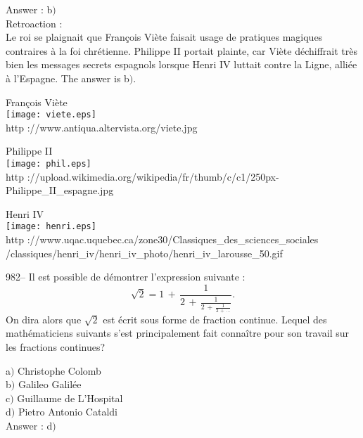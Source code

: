 ﻿\documentclass[letterpaper, 12pt]{article}
\begin{document}
Answer : b$)$\\

Retroaction : \\
Le roi se plaignait que Fran\c cois Vi\`ete faisait usage de
pratiques magiques contraires \`a la foi chr\'etienne. Philippe II
portait plainte, car Vi\`ete d\'echiffrait tr\`es bien les messages
secrets espagnols lorsque Henri IV luttait contre la Ligne, alli\'ee
\`a l'Espagne.
The answer is b$)$.\\

        \begin{center}
        Fran\c cois Vi\`ete\\
    \texttt{[image: viete.eps]}\\
        {\footnotesize http ://www.antiqua.altervista.org/viete.jpg}
    \end{center}

        \begin{center}
        Philippe II\\
    \texttt{[image: phil.eps]}\\
        {\footnotesize http
://upload.wikimedia.org/wikipedia/fr/thumb/c/c1/250px-Philippe\_II\_espagne.jpg}
    \end{center}

        \begin{center}
        Henri IV\\
    \texttt{[image: henri.eps]}\\
        {\footnotesize http
://www.uqac.uquebec.ca/zone30/Classiques\_des\_sciences\_sociales\\
        /classiques/henri\_iv/henri\_iv\_photo/henri\_iv\_larousse\_50.gif}
    \end{center}

982-- Il est possible de d\'emontrer l'expression suivante :
$$\sqrt2=1\,+\,\frac1{2\,+\,\frac1{2\,+\,\frac1{2\,+\,\ldots}}}.$$
On dira alors que $\sqrt2$ est \'ecrit sous forme de fraction
continue. Lequel des math\'ematiciens suivants s'est principalement
fait conna\^itre pour son travail sur les fractions continues?

a$)$ Christophe Colomb \\
b$)$ Galileo Galil\'ee \\
c$)$ Guillaume de L'Hospital \\
d$)$ Pietro Antonio Cataldi\\

Answer : d$)$\\
\end{document}
